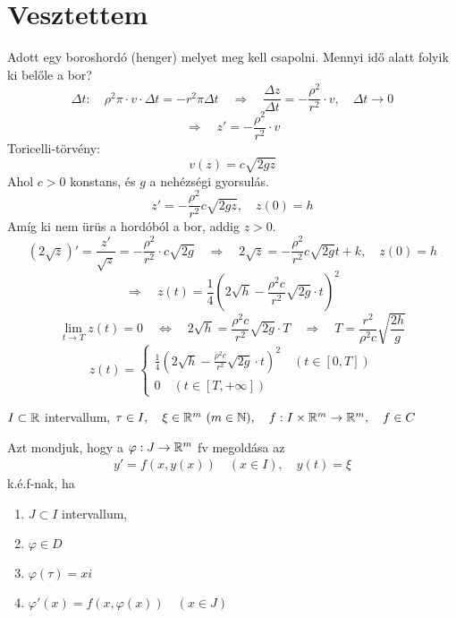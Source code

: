 \documentclass[a4paper,11.5pt]{article}
\begin{document}
	\section{Vesztettem}
	\begin{task}
		Adott egy boroshordó (henger) melyet meg kell csapolni. Mennyi idő alatt folyik ki belőle a bor?
		\[ \varDelta t:\quad \rho^2\pi\cdot v\cdot\varDelta t=-r^2\pi\varDelta t\quad \Rightarrow\quad \frac{\varDelta z}{\varDelta t}=-\frac{\rho^2}{r^2}\cdot v,\quad \varDelta t\to0 \]
		\[ \Rightarrow\quad z'=-\frac{\rho^2}{r^2}\cdot v \]
		Toricelli-törvény:
		\[ v(z)=c\sqrt{2gz} \]
		Ahol $c>0$ konstans, és $g$ a nehézségi gyorsulás.
		\[ z'=-\frac{\rho^2}{r^2}c\sqrt{2gz},\quad z(0)=h \]
		Amíg ki nem ürüs a hordóból a bor, addig $z>0$.
		\[(2\sqrt{z})' =\frac{z'}{\sqrt{z}}=-\frac{\rho^2}{r^2}\cdot c\sqrt{2g}\quad \Rightarrow\quad 2\sqrt{z}=-\frac{\rho^2}{r^2}c\sqrt{2g}t+k,\quad z(0)=h \]
		\[ \Rightarrow\quad z(t)=\frac{1}{4}\left(2\sqrt{h}-\frac{\rho^2c}{r^2}\sqrt{2g}\cdot t\right)^2 \]
		\[ \lim_{t\to T}z(t)=0\quad \Leftrightarrow\quad 2\sqrt{h}=\frac{\rho^2c}{r^2}\sqrt{2g}\cdot T\quad \Rightarrow\quad T=\frac{r^2}{\rho^2c}\sqrt{\frac{2h}{g}} \]
		\[ z(t)=\begin{cases}
			\frac{1}{4}\left(2\sqrt{h}-\frac{\rho^2c}{r^2}\sqrt{2g}\cdot t \right)^2\quad (t\in [0,T])\\
			0\quad (t\in[T,+\infty])
		\end{cases} \]
	\end{task}
	\begin{definition}
		$I\subset \mathbb{R}$ intervallum, $\tau\in I,\quad \xi \in \mathbb{R}^m\ (m\in\mathbb{N}),\quad f: I\times\mathbb{R}^m\to\mathbb{R}^m,\quad f\in C$
		
		Azt mondjuk, hogy a $\varphi:J\to\mathbb{R}^m$ fv megoldása az
		\begin{gather}\label{1}
		y'=f(x,y(x))\quad (x\in I),\quad y(t)=\xi
		\end{gather}
		k.é.f-nak, ha
		\begin{enumerate}
			\item $J\subset I$ intervallum,
			\item $\varphi \in D$
			\item $\varphi(\tau)=xi$
			\item $\varphi'(x)=f(x,\varphi(x))\quad (x\in J)$
		\end{enumerate}
	\end{definition}
\end{document}
